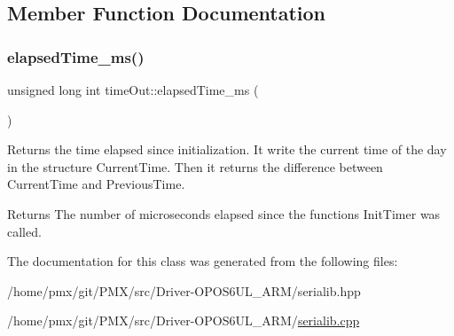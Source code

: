 \subsection{Member Function Documentation}
\mbox{\label{classtimeOut_af5db5b5f0db4f6ada19187ef8f214214}} 
\subsubsection{\texorpdfstring{elapsed\+Time\+\_\+ms()}{elapsedTime\_ms()}}
{\footnotesize\ttfamily unsigned long int time\+Out\+::elapsed\+Time\+\_\+ms (\begin{DoxyParamCaption}{ }\end{DoxyParamCaption})}



Returns the time elapsed since initialization. It write the current time of the day in the structure Current\+Time. Then it returns the difference between Current\+Time and Previous\+Time. 

\begin{DoxyReturn}{Returns}
The number of microseconds elapsed since the functions Init\+Timer was called. 
\end{DoxyReturn}


The documentation for this class was generated from the following files\+:\begin{DoxyCompactItemize}
\item 
/home/pmx/git/\+P\+M\+X/src/\+Driver-\/\+O\+P\+O\+S6\+U\+L\+\_\+\+A\+R\+M/serialib.\+hpp\item 
/home/pmx/git/\+P\+M\+X/src/\+Driver-\/\+O\+P\+O\+S6\+U\+L\+\_\+\+A\+R\+M/\hyperlink{serialib_8cpp}{serialib.\+cpp}\end{DoxyCompactItemize}
